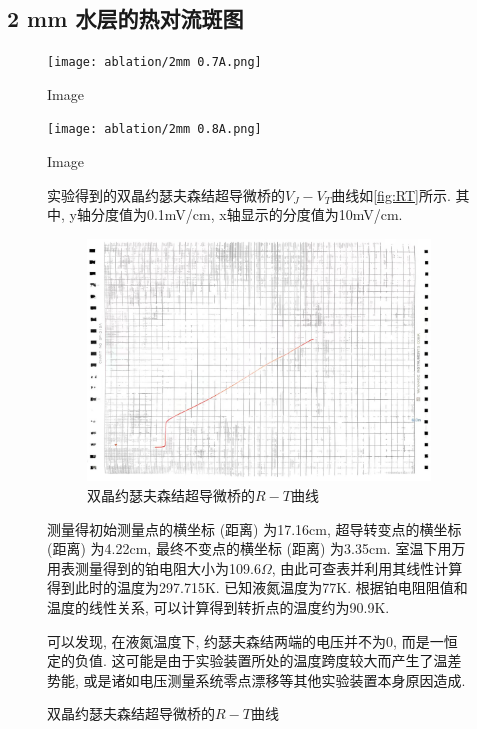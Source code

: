 \documentclass[font=default]{mpltx}
\begin{document}
  \subsection{2 mm 水层的热对流斑图}
  \begin{figure}[h]
      
    \begin{minipage}{0.32\linewidth}
      \vspace{3pt}
      \centerline{\texttt{[image: ablation/2mm 0.7A.png]}}
      \centerline{Image}
    \end{minipage}
    \begin{minipage}{0.32\linewidth}
      \vspace{3pt}
      \centerline{\texttt{[image: ablation/2mm 0.8A.png]}}
      \vspace{3pt}
  
      \centerline{Image}
    \end{minipage}

  实验得到的双晶约瑟夫森结超导微桥的$V_J-V_T$曲线如\autoref{fig:RT}所示. 其中, y轴分度值为0.1mV/cm, x轴显示的分度值为10mV/cm.
  \begin{figure}[htbp]
    \centering
    \includegraphics[width=0.85\linewidth]{fig/3.jpg}
    \caption{双晶约瑟夫森结超导微桥的$R-T$曲线}
    \label{fig:RT}
  \end{figure}

  测量得初始测量点的横坐标 (距离) 为17.16cm, 超导转变点的横坐标 (距离) 为4.22cm, 最终不变点的横坐标 (距离) 为3.35cm.
  室温下用万用表测量得到的铂电阻大小为109.6$\Omega$, 由此可查表并利用其线性计算得到此时的温度为297.715K.
  已知液氮温度为77K. 根据铂电阻阻值和温度的线性关系, 可以计算得到转折点的温度约为90.9K. 

  \par
  可以发现, 在液氮温度下, 约瑟夫森结两端的电压并不为0, 而是一恒定的负值. 这可能是由于实验装置所处的温度跨度较大而产生了温差势能, 或是诸如电压测量系统零点漂移等其他实验装置本身原因造成.



\end{figure}
\end{document}
